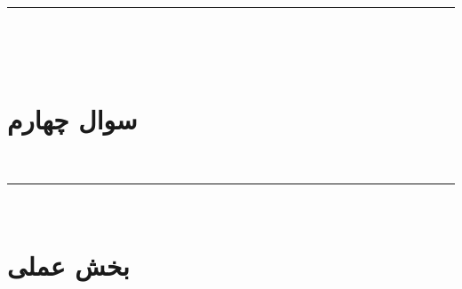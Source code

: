 ‫\vspace{1cm}
‫
‫\hrule height .4 pt depth 0 pt width 16 cm \relax
‫
‫‫%

‫\section{سوال چهارم}

‫\vspace{1cm}
‫
‫\hrule height .4 pt depth 0 pt width 16 cm \relax
‫
‫‫%
‫
‫‫‫\section*{بخش عملی}
‫
‫